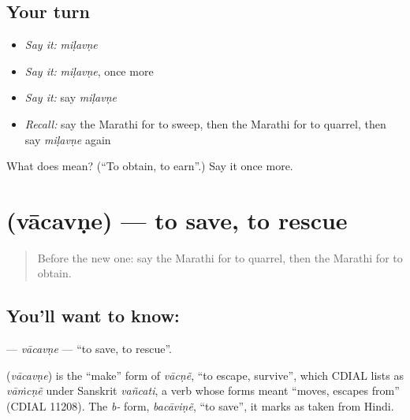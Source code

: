 \subsection*{Your turn}
\begin{itemize}
\raggedright
  \item \emph{Say it:} \emph{miḷavṇe}
  \item \emph{Say it:} \emph{miḷavṇe}, once more
  \item \emph{Say it:} say \emph{miḷavṇe}
  \item \emph{Recall:} say the Marathi for to sweep, then the Marathi for to quarrel, then say \emph{miḷavṇe} again
\end{itemize}

\begin{tcolorbox}[breakable,colback=teal!4,colframe=teal!35!black,title={Before you move on}]
What does  mean? (\textquotedblleft{}To obtain, to earn\textquotedblright{}.) Say it once more.
\end{tcolorbox}
\section[\texorpdfstring{\mr{वाचवणे} (vācavṇe)}{वाचवणे (vācavṇe)}]{ (vācavṇe) — to save, to rescue}

\label{lesson:MR-C158-vacavne}



\begin{quote}
Before the new one: say the Marathi for to quarrel, then the Marathi for to obtain.
\end{quote}

\subsection*{You'll want to know: }
\textbf{} — \emph{vācavṇe} — \textquotedblleft{}to save, to rescue\textquotedblright{}.

\begin{cousinweb}
\textbf{} (\emph{vācavṇe}) is the \textquotedblleft{}make\textquotedblright{} form of \emph{vācṇẽ}, \textquotedblleft{}to escape, survive\textquotedblright{}, which CDIAL lists as \emph{vāṁcṇẽ} under Sanskrit \emph{vañcati}, a verb whose forms meant \textquotedblleft{}moves, escapes from\textquotedblright{} (CDIAL 11208). The \emph{b-} form, \emph{bacāviṇẽ}, \textquotedblleft{}to save\textquotedblright{}, it marks as taken from Hindi.
\end{cousinweb}


